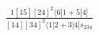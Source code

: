 \documentclass[varwidth, border=5pt]{standalone}
\begin{document}
\begin{my}
$\begin{gathered}
\scriptscriptstyle\frac{1[15][24]^2⟨6|1+5|4]}{[14][34]^2⟨1|2+3|4]s_{234}}
\end{gathered}$
\end{my}
\end{document}
